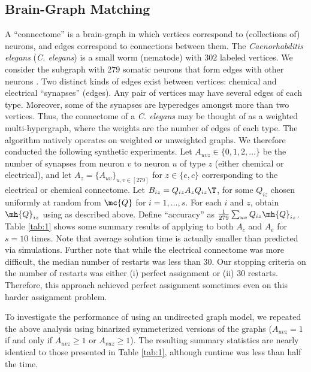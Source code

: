 \documentclass[10pt,journal,cspaper,compsoc]{IEEEtran}
\begin{document}


\subsection{Brain-Graph Matching} %
\label{sub:connectome_classification}

A ``connectome'' is a brain-graph in which vertices correspond to (collections of) neurons, and edges correspond to connections between them. The \emph{Caenorhabditis elegans} (\emph{C. elegans}) is a small worm (nematode) with $302$ labeled vertices.  We consider the subgraph with $279$ somatic neurons that form edges with other neurons \cite{WhiteBrenner86, Varshney2011}.  Two distinct kinds of edges exist between vertices: chemical and electrical ``synapses'' (edges). Any pair of vertices may have several edges of each type. Moreover, some of the synapses are hyperedges amongst more than two vertices.    Thus, the connectome of a \emph{C. elegans} may be thought of as a weighted multi-hypergraph, where the weights are the number of edges of each type.  The \qapm algorithm natively operates on weighted or unweighted graphs.  We therefore conducted the following synthetic experiments.  Let $A_{uvz} \in \{0,1,2,\ldots\}$ be the number of synapses from neuron $v$ to neuron $u$ of type $z$ (either chemical or electrical), and let $A_z=\{A_{uv}\}_{u,v \in [279]}$ for $z \in \{e,c\}$ corresponding to the electrical or chemical connectome.  Let $B_{iz}=Q_{iz} A_z Q_{iz}\T$, for some $Q_{iz}$ chosen uniformly at random from $\mc{Q}$ for $i=1,\ldots,s$.  For each $i$ and $z$, obtain $\mh{Q}_{iz}$ using \qapm as described above.  Define ``accuracy'' as $\frac{1}{279}\sum_{uv} Q_{iz} \mh{Q}_{iz}$.  Table \ref{tab:1} shows some summary results of applying \qapm to both $A_c$ and $A_e$ for $s=10$ times.  Note that average solution time is actually smaller than predicted via simulations.  Further note that while the electrical connectome was more difficult, the median number of restarts was less than $30$.  Our stopping criteria on the number of restarts was either (i) perfect assignment or (ii) 30 restarts.  Therefore, this approach achieved perfect assignment sometimes even on this harder assignment problem.

To investigate the performance of \qap using an undirected graph model, we repeated the above analysis using binarized symmeterized versions of the graphs ($A_{uvz}=1$ if and only if $A_{uvz}\geq 1$ or $A_{vuz} \geq 1$).  The resulting summary statistics are nearly identical to those presented in Table \ref{tab:1}, although runtime was less than half the time.
\end{document}
